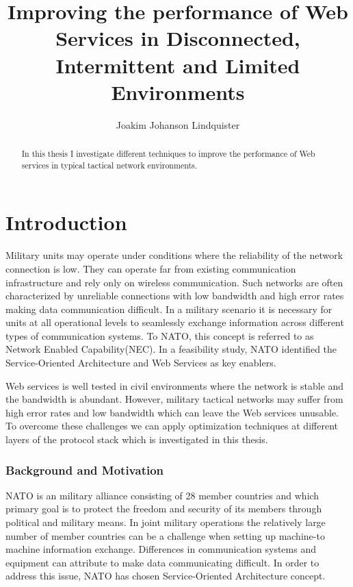 \documentclass[USenglish]{article}
\title{Improving the performance of Web Services in Disconnected, Intermittent and Limited Environments}
\author{Joakim Johanson Lindquister}
\begin{document}
\ififorside{}

\begin{abstract}
In this thesis I investigate different techniques to improve the performance of Web services in typical tactical network environments.
\end{abstract}
\pagebreak

\tableofcontents 
\listoftables
\listoffigures

\pagebreak


\part{Introduction}
Military units may operate under conditions where the reliability of the network connection is low. They can operate far from existing communication infrastructure and rely only on wireless communication. Such networks are often characterized by unreliable connections with low bandwidth and high error rates making data communication difficult. In a military scenario it is necessary for units at all operational levels to seamlessly exchange information across different types of communication systems. To NATO, this concept is referred to as Network Enabled Capability(NEC). In a feasibility study, NATO identified the Service-Oriented Architecture and Web Services as key enablers\cite{nnec-study}.

Web services is well tested in civil environments where the network is stable and the bandwidth is abundant. However, military tactical networks may suffer from high error rates and low bandwidth which can leave the Web services unusable. To overcome these challenges we can apply optimization techniques at different layers of the protocol stack which is investigated in this thesis.


\section{Background and Motivation}
NATO is an military alliance consisting of 28 member countries\cite{nato-homepage-member-countries} and which primary goal is to protect the freedom and security of its members through political and military means. In joint military operations the relatively large number of member countries can be a challenge when setting up machine-to machine information exchange. Differences in communication systems and equipment can attribute to make data communicating difficult. In order to address this issue, NATO has chosen Service-Oriented Architecture concept.
\end{document}
